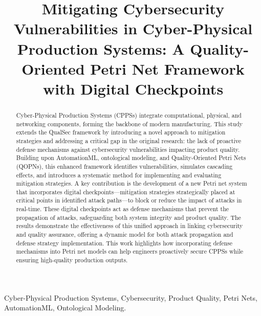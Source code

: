 \documentclass[conference]{IEEEtran}
\begin{document}
\title{Mitigating Cybersecurity Vulnerabilities in Cyber-Physical Production Systems: A Quality-Oriented Petri Net Framework with Digital Checkpoints}

\author{
\and
{}
}

\maketitle

\begin{abstract}
Cyber-Physical Production Systems (CPPSs) integrate computational, physical, and networking components, forming the backbone of modern manufacturing. This study extends the QualSec framework by introducing a novel approach to mitigation strategies and addressing a critical gap in the original research: the lack of proactive defense mechanisms against cybersecurity vulnerabilities impacting product quality. Building upon AutomationML, ontological modeling, and Quality-Oriented Petri Nets (QOPNs), this enhanced framework identifies vulnerabilities, simulates cascading effects, and introduces a systematic method for implementing and evaluating mitigation strategies. A key contribution is the development of a new Petri net system that incorporates digital checkpoints—mitigation strategies strategically placed at critical points in identified attack paths—to block or reduce the impact of attacks in real-time. These digital checkpoints act as defense mechanisms that prevent the propagation of attacks, safeguarding both system integrity and product quality. The results demonstrate the effectiveness of this unified approach in linking cybersecurity and quality assurance, offering a dynamic model for both attack propagation and defense strategy implementation. This work highlights how incorporating defense mechanisms into Petri net models can help engineers proactively secure CPPSs while ensuring high-quality production outputs.
\end{abstract}

\begin{IEEEkeywords}
Cyber-Physical Production Systems, Cybersecurity, Product Quality, Petri Nets, AutomationML, Ontological Modeling.
\end{IEEEkeywords}
\end{document}
